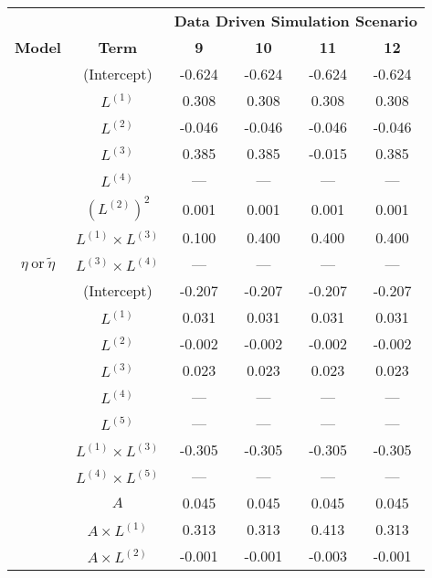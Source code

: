 \begin{table}
\begin{minipage}[t]{0.5\textwidth}
\centering

\begin{tabular}[t]{|>{}c|c|c|c|c|>{}c|}
\hline
\multicolumn{1}{|c|}{\textbf{ }} & \multicolumn{1}{|c|}{\textbf{ }} & \multicolumn{4}{|c|}{\textbf{Data Driven Simulation Scenario}} \\
\cline{3-6}
\textbf{Model} & \textbf{Term} & \textbf{9} & \textbf{10} & \textbf{11} & \textbf{12}\\
\hline
 & (Intercept) & -0.624 & -0.624 & -0.624 & -0.624\\
\cline{2-6}
 & $L^{(1)}$ & 0.308 & 0.308 & 0.308 & 0.308\\
\cline{2-6}
 & $L^{(2)}$ & -0.046 & -0.046 & -0.046 & -0.046\\
\cline{2-6}
 & $L^{(3)}$ & 0.385 & 0.385 & -0.015 & 0.385\\
\cline{2-6}
 & $L^{(4)}$ & --- & --- & --- & ---\\
\cline{2-6}
 & $(L^{(2)})^2$ & 0.001 & 0.001 & 0.001 & 0.001\\
\cline{2-6}
 & $L^{(1)} \times L^{(3)}$ & 0.100 & 0.400 & 0.400 & 0.400\\
\cline{2-6}
\multirow{-8}{*}{\centering\arraybackslash $\eta~\text{or}~\tilde\eta$} & $L^{(3)} \times L^{(4)}$ & --- & --- & --- & ---\\
\cline{1-6}
 & (Intercept) & -0.207 & -0.207 & -0.207 & -0.207\\
\cline{2-6}
 & $L^{(1)}$ & 0.031 & 0.031 & 0.031 & 0.031\\
\cline{2-6}
 & $L^{(2)}$ & -0.002 & -0.002 & -0.002 & -0.002\\
\cline{2-6}
 & $L^{(3)}$ & 0.023 & 0.023 & 0.023 & 0.023\\
\cline{2-6}
 & $L^{(4)}$ & --- & --- & --- & ---\\
\cline{2-6}
 & $L^{(5)}$ & --- & --- & --- & ---\\
\cline{2-6}
 & $L^{(1)} \times L^{(3)}$ & -0.305 & -0.305 & -0.305 & -0.305\\
\cline{2-6}
 & $L^{(4)} \times L^{(5)}$ & --- & --- & --- & ---\\
\cline{2-6}
 & $A$ & 0.045 & 0.045 & 0.045 & 0.045\\
\cline{2-6}
 & $A \times L^{(1)}$ & 0.313 & 0.313 & 0.413 & 0.313\\
\cline{2-6}
 & $A \times L^{(2)}$ & -0.001 & -0.001 & -0.003 & -0.001\\
\cline{2-6}

\end{tabular}
\end{minipage}
\end{table}
